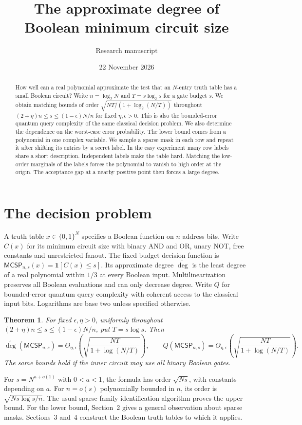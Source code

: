 \documentclass[11pt]{article}
\title{The approximate degree of Boolean minimum circuit size}
\author{Research manuscript}\date{22 November 2026}
\newtheorem{theorem}{Theorem}[section]
\newcommand{\mc}{\mathsf{MCSP}}
\newcommand{\ad}{\widetilde{\deg}}
\begin{document}
\maketitle
\begin{abstract}
How well can a real polynomial approximate the test that an $N$-entry truth table has a small Boolean circuit? Write $n=\log_2 N$ and $T=s\log_2 s$ for a gate budget $s$. We obtain matching bounds of order $\sqrt{NT/(1+\log_2(N/T))}$ throughout $(2+\eta)n\le s\le(1-\epsilon)N/n$ for fixed $\eta,\epsilon>0$. This is also the bounded-error quantum query complexity of the same classical decision problem. We also determine the dependence on the worst-case error probability. The lower bound comes from a polynomial in one complex variable. We sample a sparse mask in each row and repeat it after shifting its entries by a secret label. In the easy experiment many row labels share a short description. Independent labels make the table hard. Matching the low-order marginals of the labels forces the polynomial to vanish to high order at the origin. The acceptance gap at a nearby positive point then forces a large degree.
\end{abstract}

\section{The decision problem}
A truth table $x\in\{0,1\}^N$ specifies a Boolean function on $n$ address bits. Write $C(x)$ for its minimum circuit size with binary AND and OR, unary NOT, free constants and unrestricted fanout. The fixed-budget decision function is $\mc_{n,s}(x)=\mathbf1[C(x)\le s]$. Its approximate degree $\ad$ is the least degree of a real polynomial within $1/3$ at every Boolean input. Multilinearization preserves all Boolean evaluations and can only decrease degree. Write $Q$ for bounded-error quantum query complexity with coherent access to the classical input bits. Logarithms are base two unless specified otherwise.
\begin{theorem}\label{th:main}
For fixed $\epsilon,\eta>0$, uniformly throughout $(2+\eta)n\le s\le(1-\epsilon)N/n$, put $T=s\log s$. Then
\[
 \ad(\mc_{n,s})=\Theta_{\eta,\epsilon}\!\left(\sqrt{\frac{NT}{1+\log(N/T)}}\right),
 \qquad Q(\mc_{n,s})=\Theta_{\eta,\epsilon}\!\left(\sqrt{\frac{NT}{1+\log(N/T)}}\right).
\]
The same bounds hold if the inner circuit may use all binary Boolean gates.
\end{theorem}
For $s=N^{a+o(1)}$ with $0<a<1$, the formula has order $\sqrt{Ns}$, with constants depending on $a$. For $n=o(s)$ polynomially bounded in $n$, its order is $\sqrt{Ns\log s/n}$. The usual sparse-family identification algorithm proves the upper bound. For the lower bound, Section~2 gives a general observation about sparse masks. Sections~3 and~4 construct the Boolean truth tables to which it applies.
\end{document}
